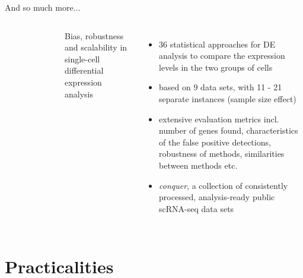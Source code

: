 \documentclass{beamer}\usepackage[]{graphicx}\usepackage[]{color}
\begin{document}
\begin{frame}
And so much more...
\vspace{0.1cm}
\begin{columns}
\begin{center}
\begin{figure}
\includegraphics[width=5cm, height=6cm]{Images/Robinson-2018-heatmap}
\caption{\cite{Soneson2018}}
\end{figure}
\end{center}
\scriptsize
Bias, robustness and scalability in single-cell differential expression analysis
\begin{itemize}
  \item 36 statistical approaches for DE analysis to compare the expression levels in the two groups of cells
  \item based on 9 data sets, with 11 - 21 separate instances (sample size effect)
  \item extensive evaluation metrics incl. number of genes found, characteristics of the false positive detections, robustness of methods, similarities between methods etc. 
  \item \textit{conquer}, a collection of consistently processed, analysis-ready public scRNA-seq data sets
\end{itemize}
\end{columns}
\end{frame}


\section{Practicalities}
\begin{frame}
\begin{center}
\insertsection
\end{center}
\end{frame}
\end{document}
